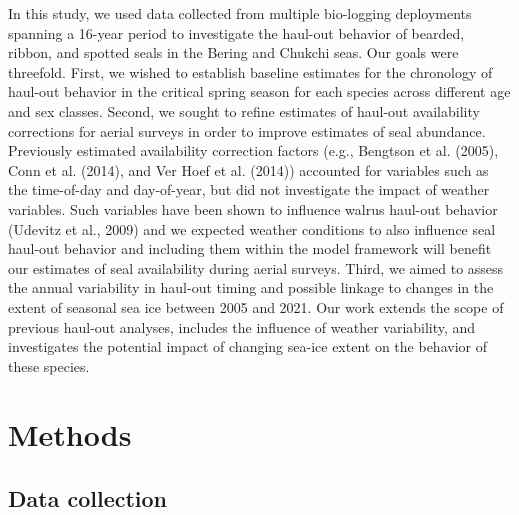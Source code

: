 \documentclass[fleqn,10pt,lineno]{wlpeerj} %
\begin{document}
In this study, we used data collected from multiple bio-logging deployments
spanning a 16-year period to investigate the haul-out
behavior of bearded, ribbon, and spotted seals in the Bering and Chukchi seas.
Our goals were threefold. First, we wished to establish baseline estimates for
the chronology of haul-out behavior in the critical spring season for each
species across different age and sex classes. Second, we sought to refine
estimates of haul-out availability corrections for aerial surveys in order to
improve estimates of seal abundance. Previously estimated availability
correction factors (e.g., Bengtson et al. (2005), Conn et al. (2014), and Ver Hoef et al. (2014))
accounted for variables such as the time-of-day and day-of-year, but did not
investigate the impact of weather variables. Such variables have been
shown to influence walrus haul-out behavior (Udevitz et al., 2009) and we expected weather
conditions to also influence seal haul-out behavior and including them within
the model framework will benefit our estimates of seal availability during
aerial surveys. Third, we aimed to assess the annual variability in haul-out
timing and possible linkage to changes in the extent of seasonal sea ice between
2005 and 2021. Our work extends the scope of previous haul-out analyses,
includes the influence of weather variability, and investigates the
potential impact of changing sea-ice extent on the behavior of these species.

\section*{Methods}\label{methods}

\subsection*{Data collection}\label{data-collection}
\end{document}
